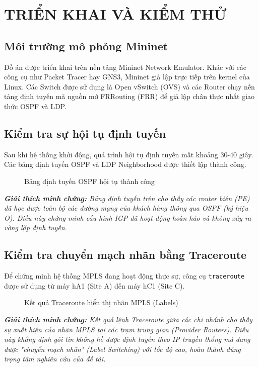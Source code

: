 \section{TRIỂN KHAI VÀ KIỂM THỬ}

\subsection{Môi trường mô phỏng Mininet}
Đồ án được triển khai trên nền tảng Mininet Network Emulator. Khác với các công cụ như Packet Tracer hay GNS3, Mininet giả lập trực tiếp trên kernel của Linux. Các Switch được sử dụng là Open vSwitch (OVS) và các Router chạy nền tảng định tuyến mã nguồn mở FRRouting (FRR) để giả lập chân thực nhất giao thức OSPF và LDP.

\subsection{Kiểm tra sự hội tụ định tuyến}
Sau khi hệ thống khởi động, quá trình hội tụ định tuyến mất khoảng 30-40 giây. Các bảng định tuyến OSPF và LDP Neighborhood được thiết lập thành công.

\begin{figure}[H]
    \centering
    \caption{Bảng định tuyến OSPF hội tụ thành công}
    \label{fig:ospf_route}
\end{figure}
\textit{\textbf{Giải thích minh chứng:} Bảng định tuyến trên cho thấy các router biên (PE) đã học được toàn bộ các đường mạng của khách hàng thông qua OSPF (ký hiệu O). Điều này chứng minh cấu hình IGP đã hoạt động hoàn hảo và không xảy ra vòng lặp định tuyến.}

\subsection{Kiểm tra chuyển mạch nhãn bằng Traceroute}
Để chứng minh hệ thống MPLS đang hoạt động thực sự, công cụ \texttt{traceroute} được sử dụng từ máy hA1 (Site A) đến máy hC1 (Site C).

\begin{figure}[H]
    \centering
    \caption{Kết quả Traceroute hiển thị nhãn MPLS (Labels)}
    \label{fig:traceroute}
\end{figure}
\textit{\textbf{Giải thích minh chứng:} Kết quả lệnh Traceroute giữa các chi nhánh cho thấy sự xuất hiện của nhãn MPLS tại các trạm trung gian (Provider Routers). Điều này khẳng định gói tin không hề được định tuyến theo IP truyền thống mà đang được "chuyển mạch nhãn" (Label Switching) với tốc độ cao, hoàn thành đúng trọng tâm nghiên cứu của đề tài.}

